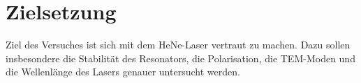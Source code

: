 
\section{Zielsetzung}
\label{sec:Zielsetzung}
Ziel des Versuches ist sich mit dem HeNe-Laser vertraut zu machen. Dazu sollen insbesondere die Stabilität des Resonators, die Polarisation, die TEM-Moden und die Wellenlänge des Lasers genauer untersucht werden.
